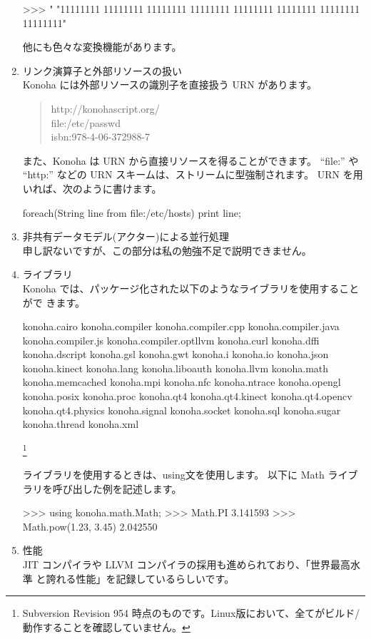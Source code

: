 \documentclass[mingoth,a4paper]{jsarticle}
\begin{document}
\begin{enumerate}
\begin{commandline}
>>> "%
"11111111 11111111 11111111 11111111 11111111 11111111 11111111 11111111"
\end{commandline}

他にも色々な変換機能があります。

\item リンク演算子と外部リソースの扱い\\
Konoha には外部リソースの識別子を直接扱う URN があります。

\begin{quote}
    http://konohascript.org/\\
    file:/etc/passwd\\
    isbn:978-4-06-372988-7
\end{quote}

また、Konoha は URN から直接リソースを得ることができます。
``file:'' や ``http:'' などの URN スキームは、ストリームに型強制されます。
URN を用いれば、次のように書けます。

\begin{commandline}
foreach(String line from file:/etc/hosts) {
  print line;
}
\end{commandline}

\item 非共有データモデル(アクター)による並行処理\\
申し訳ないですが、この部分は私の勉強不足で説明できません。

\item ライブラリ\\
Konoha では、パッケージ化された以下のようなライブラリを使用することがで
きます。
\begin{commandline}
konoha.cairo konoha.compiler konoha.compiler.cpp konoha.compiler.java konoha.compiler.js konoha.compiler.optllvm konoha.curl
konoha.dffi konoha.dscript konoha.gsl konoha.gwt konoha.i konoha.io konoha.json konoha.kinect konoha.lang konoha.liboauth
konoha.llvm konoha.math konoha.memcached konoha.mpi konoha.nfc konoha.ntrace konoha.opengl konoha.posix konoha.proc
konoha.qt4 konoha.qt4.kinect konoha.qt4.opencv konoha.qt4.physics konoha.signal konoha.socket konoha.sql konoha.sugar
konoha.thread konoha.xml
\end{commandline}
\footnote{Subversion Revision 954 時点のものです。Linux版において、全てがビルド/動作することを確認していません。}

ライブラリを使用するときは、using文を使用します。
以下に Math ライブラリを呼び出した例を記述します。
\begin{commandline}
>>> using konoha.math.Math;
>>> Math.PI 3.141593
>>> Math.pow(1.23, 3.45)
2.042550
\end{commandline}

\item 性能\\
JIT コンパイラや LLVM コンパイラの採用も進められており、「世界最高水準
と誇れる性能」を記録しているらしいです。

\end{enumerate}
\end{document}

